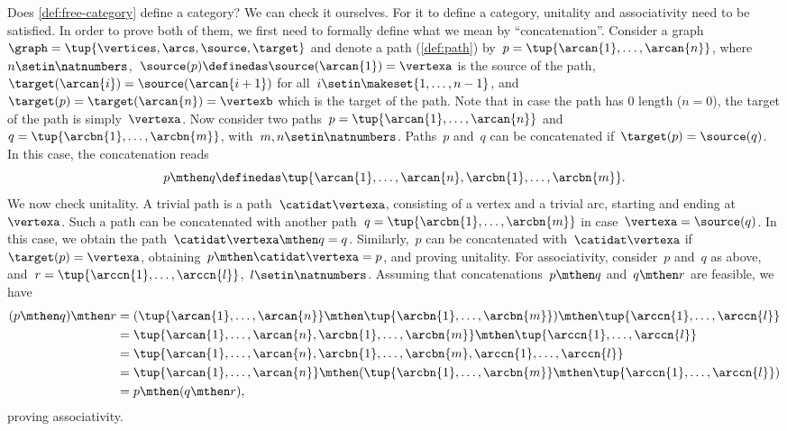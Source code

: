 Does \cref{def:free-category} define a category?
We can check it ourselves.
For it to define a category, unitality and associativity need to be satisfied.
In order to prove both of them, we first need to formally define what we mean by ``concatenation''.
Consider a graph~$\graph=\tup{\vertices,\arcs,\source,\target}$ and denote a path (\cref{def:path}) by~$p=\tup{\arcan{1},\ldots, \arcan{n}}$, where~$n\setin \natnumbers$,~$\source(p)\definedas\source(\arcan{1})=\vertexa$ is the source of the path,~$\target(\arcan{i})=\source(\arcan{i+1})$ for all~$i\setin \makeset{1,\ldots,n-1}$, and~$\target(p)=\target(\arcan{n})=\vertexb$ which is the target of the path.
Note that in case the path has 0 length ($n=0$), the target of the path is simply~$\vertexa$.
Now consider two paths~$p=\tup{\arcan{1},\ldots,\arcan{n}}$ and~$q=\tup{\arcbn{1},\ldots,\arcbn{m}}$, with~$m,n\setin \natnumbers$.
Paths~$p$ and~$q$ can be concatenated if~$\target(p)=\source(q)$.
In this case, the concatenation reads
%
\begin{equation}
    p\mthen q\definedas \tup{\arcan{1},\ldots, \arcan{n},\arcbn{1},\ldots,\arcbn{m}}.
\end{equation}
%
We now check unitality.
A trivial path is a path~$\catidat\vertexa$, consisting of a vertex and a trivial arc, starting and ending at~$\vertexa$.
Such a path can be concatenated with another path~$q=\tup{\arcbn{1},\ldots,\arcbn{m}}$ in case~$\vertexa=\source(q)$.
In this case, we obtain the path~$\catidat\vertexa \mthen q=q$.
Similarly,~$p$ can be concatenated with~$\catidat\vertexa$ if~$\target(p)=\vertexa$, obtaining~$p\mthen \catidat\vertexa=p$, and proving unitality.
For associativity, consider~$p$ and~$q$ as above, and~$r=\tup{\arccn{1},\ldots,\arccn{l}}$,~$l\setin \natnumbers$.
Assuming that concatenations~$p\mthen q$ and~$q\mthen r$ are feasible, we have
\begin{equation}
    \begin{aligned}
        (p\mthen q)
        \mthen r & =(\tup{\arcan{1},\ldots, \arcan{n}}\mthen \tup{\arcbn{1},\ldots,\arcbn{m}})\mthen \tup{\arccn{1},\ldots,\arccn{l}} \\
                 & =\tup{\arcan{1},\ldots, \arcan{n},\arcbn{1},\ldots,\arcbn{m}}\mthen \tup{\arccn{1},\ldots,\arccn{l}} \\
                 & = \tup{\arcan{1},\ldots, \arcan{n},\arcbn{1},\ldots,\arcbn{m}, \arccn{1},\ldots,\arccn{l}} \\
                 & =\tup{\arcan{1},\ldots, \arcan{n}} \mthen (\tup{\arcbn{1},\ldots,\arcbn{m}}\mthen \tup{\arccn{1},\ldots,\arccn{l}}) \\
                 & =p\mthen (q\mthen r),
    \end{aligned}
\end{equation}
proving associativity.

